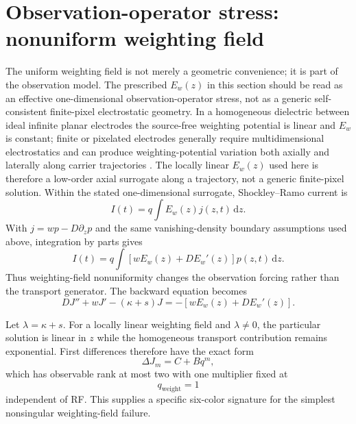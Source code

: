 \documentclass[11pt]{article}
\newcommand{\dd}{\mathrm{d}}
\begin{document}
\section{Observation-operator stress: nonuniform weighting field}

The uniform weighting field is not merely a geometric convenience; it is part of the observation model. The prescribed $E_w(z)$ in this section should be read as an effective one-dimensional observation-operator stress, not as a generic self-consistent finite-pixel electrostatic geometry. In a homogeneous dielectric between ideal infinite planar electrodes the source-free weighting potential is linear and $E_w$ is constant; finite or pixelated electrodes generally require multidimensional electrostatics and can produce weighting-potential variation both axially and laterally along carrier trajectories \cite{Eskin1999}. The locally linear $E_w(z)$ used here is therefore a low-order axial surrogate along a trajectory, not a generic finite-pixel solution. Within the stated one-dimensional surrogate, Shockley--Ramo current is
\begin{equation}
I(t)=q\int E_w(z)j(z,t)\,\dd z.
\end{equation}
With $j=wp-D\partial_zp$ and the same vanishing-density boundary assumptions used above, integration by parts gives
\begin{equation}
\boxed{I(t)=q\int\left[wE_w(z)+DE_w'(z)\right]p(z,t)\,\dd z.}
\label{eq:weighting_operator}
\end{equation}
Thus weighting-field nonuniformity changes the observation forcing rather than the transport generator. The backward equation becomes
\begin{equation}
\boxed{DJ''+wJ'-(\kappa+s)J=-\left[wE_w(z)+DE_w'(z)\right].}
\label{eq:weighting_bvp}
\end{equation}

Let $\lambda=\kappa+s$. For a locally linear weighting field and $\lambda\neq0$, the particular solution is linear in $z$ while the homogeneous transport contribution remains exponential. First differences therefore have the exact form
\begin{equation}
\boxed{\Delta J_m=C+Bq^m,}
\label{eq:weighting_rank2}
\end{equation}
which has observable rank at most two with one multiplier fixed at
\begin{equation}
\boxed{q_{\mathrm{weight}}=1}
\end{equation}
independent of RF. This supplies a specific six-color signature for the simplest nonsingular weighting-field failure.
\end{document}
